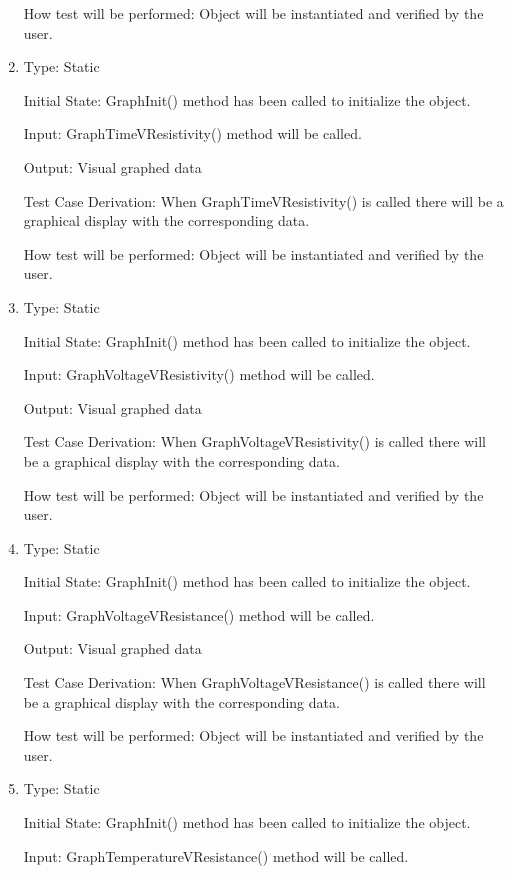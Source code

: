 \documentclass[12pt, titlepage]{article}
\begin{document}
\begin{enumerate}[{UT-GO}1.]
How test will be performed: Object will be instantiated and verified by the user.

\item

Type: Static
					
Initial State: GraphInit() method has been called to initialize the object.
					
Input: GraphTimeVResistivity() method will be called.
					
Output: Visual graphed data

Test Case Derivation: When GraphTimeVResistivity() is called there will be a graphical display with the corresponding data.

How test will be performed: Object will be instantiated and verified by the user.

\item

Type: Static
					
Initial State: GraphInit() method has been called to initialize the object.
					
Input: GraphVoltageVResistivity() method will be called.
					
Output: Visual graphed data

Test Case Derivation: When GraphVoltageVResistivity() is called there will be a graphical display with the corresponding data.

How test will be performed: Object will be instantiated and verified by the user.

\item

Type: Static
					
Initial State: GraphInit() method has been called to initialize the object.
					
Input: GraphVoltageVResistance() method will be called.
					
Output: Visual graphed data

Test Case Derivation: When GraphVoltageVResistance() is called there will be a graphical display with the corresponding data.

How test will be performed: Object will be instantiated and verified by the user.

\item

Type: Static
					
Initial State: GraphInit() method has been called to initialize the object.
					
Input: GraphTemperatureVResistance() method will be called.
					

\end{enumerate}
\end{document}
